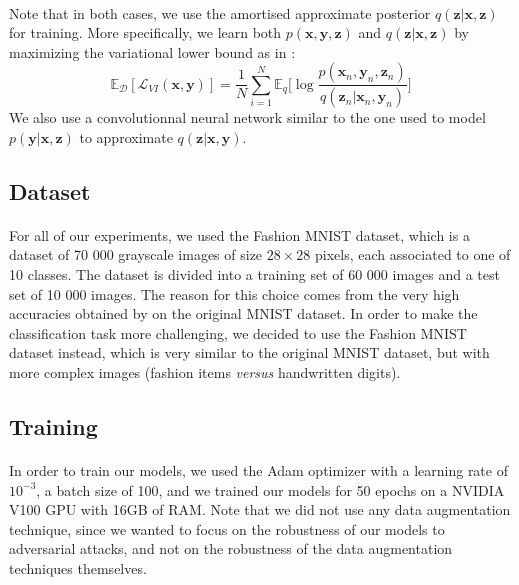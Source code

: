 \documentclass[10pt,twocolumn,letterpaper]{article}
\begin{document}
\paragraph{} Note that in both cases, we use the amortised approximate posterior $q(\bm{z}|\bm{x}, \bm{z})$ for training. More specifically, we learn both $p(\bm{x}, \bm{y}, \bm{z})$ and $q(\bm{z}|\bm{x}, \bm{z})$ by maximizing the variational lower bound as in \cite{auto_encoding_variational_bayes}:
\[ \mathbb{E}_{\mathcal{D}}[\mathcal{L}_{VI}(\bm{x}, \bm{y})] = \frac{1}{N} \sum \limits_{i=1}^N \mathbb{E}_q \Big[ \log{\frac{p(\bm{x}_n, \bm{y}_n, \bm{z}_n)}{q(\bm{z}_n|\bm{x}_n, \bm{y}_n)}} \Big] \]
We also use a convolutionnal neural network similar to the one used to model $p(\bm{y}|\bm{x}, \bm{z})$ to approximate $q(\bm{z}|\bm{x}, \bm{y})$.

\subsection{Dataset}

\paragraph{} For all of our experiments, we used the Fashion MNIST dataset, which is a dataset of 70 000 grayscale images of size $28 \times 28$ pixels, each associated to one of 10 classes. The dataset is divided into a training set of 60 000 images and a test set of 10 000 images. The reason for this choice comes from the very high accuracies obtained by \cite{main_paper} on the original MNIST dataset. In order to make the classification task more challenging, we decided to use the Fashion MNIST dataset instead, which is very similar to the original MNIST dataset, but with more complex images (fashion items \textit{versus} handwritten digits).

\subsection{Training} 

\paragraph{} In order to train our models, we used the Adam optimizer with a learning rate of $10^{-3}$, a batch size of 100, and we trained our models for 50 epochs on a NVIDIA V100 GPU with 16GB of RAM. Note that we did not use any data augmentation technique, since we wanted to focus on the robustness of our models to adversarial attacks, and not on the robustness of the data augmentation techniques themselves. 
\end{document}
